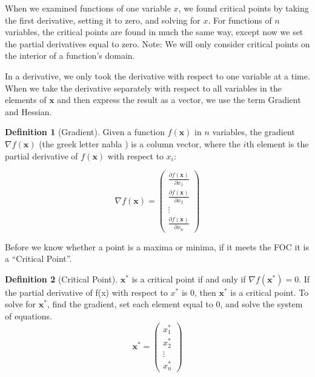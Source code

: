 \documentclass[
]{book}
\theoremstyle{definition}
\newtheorem{definition}{Definition}[chapter]
\theoremstyle{definition}
\theoremstyle{definition}
\theoremstyle{definition}
\theoremstyle{remark}
\begin{document}
When we examined functions of one variable \(x\), we found critical points by taking the first derivative, setting it to zero, and solving for \(x\). For functions of \(n\) variables, the critical points are found in much the same way, except now we set the partial derivatives equal to zero. Note: We will only consider critical points on the interior of a function's domain.

In a derivative, we only took the derivative with respect to one variable at a time. When we take the derivative separately with respect to all variables in the elements of \(\mathbf{x}\) and then express the result as a vector, we use the term Gradient and Hessian.

\begin{definition}[Gradient]
\protect\hypertarget{def:unnamed-chunk-239}{}{\label{def:unnamed-chunk-239} {} }
Given a function \(f(\textbf{x})\) in \(n\) variables, the gradient \(\nabla f(\mathbf{x})\) (the greek letter nabla ) is a column vector, where the \(i\)th element is the partial derivative of \(f(\textbf{x})\) with respect to \(x_i\):

\[\nabla f(\mathbf{x}) = \begin{pmatrix}
\frac{\partial f(\mathbf{x})}{\partial x_1}\\ \frac{\partial f(\mathbf{x})}{\partial x_2}\\
  \vdots \\ \frac{\partial f(\mathbf{x})}{\partial x_n} \end{pmatrix}\]
\end{definition}

Before we know whether a point is a maxima or minima, if it meets the FOC it is a ``Critical Point''.

\begin{definition}[Critical Point]
\protect\hypertarget{def:unnamed-chunk-240}{}{\label{def:unnamed-chunk-240} {} }
\(\mathbf{x}^*\) is a critical point if and only if \(\nabla f(\mathbf{x}^*)=0\). If the partial derivative of f(x) with respect to \(x^*\) is 0, then \(\mathbf{x}^*\) is a critical point. To solve for \(\mathbf{x}^*\), find the gradient, set each element equal to 0, and solve the system of equations. \[\mathbf{x}^* = \begin{pmatrix} x_1^*\\x_2^*\\ \vdots \\ x_n^*\end{pmatrix}\]
\end{definition}
\end{document}
